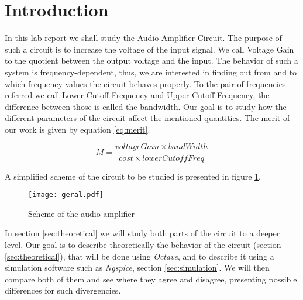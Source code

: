 \section{Introduction}
\label{sec:introduction}

\par In this lab report we shall study the Audio Amplifier Circuit. The purpose of such a circuit is to increase the voltage of the input signal. We call Voltage Gain to the quotient between the output voltage and the input. The behavior of such a system is frequency-dependent, thus, we are interested in finding out from and to which frequency values the circuit behaves properly. To the pair of frequencies referred we call Lower Cutoff Frequency and Upper Cutoff Frequency, the difference between those is called the bandwidth. Our goal is to study how the different parameters of the circuit affect the mentioned quantities. The merit of our work is given by equation \ref{eq:merit}.



\begin{equation}
    M = \frac{voltageGain \times bandWidth}{cost \times lowerCutoffFreq}
    \label{eq:merit}
\end{equation}



A simplified scheme of the circuit to be studied is presented in figure \ref{fig:circuit}. 

 \begin{figure}[H]   
 \centering
 \texttt{[image: geral.pdf]}
 \caption{Scheme of the audio amplifier}
 \label{fig:circuit}
 \end{figure}

In section \ref{sec:theoretical} we will study both parts of the circuit to a deeper level. Our goal is to describe theoretically the behavior of the circuit (section \ref{sec:theoretical}), that will be done using \textit{Octave}, and to describe it using a simulation software such as \textit{Ngspice}, section \ref{sec:simulation}. We will then compare both of them and see where they agree and disagree, presenting possible differences for such divergencies.